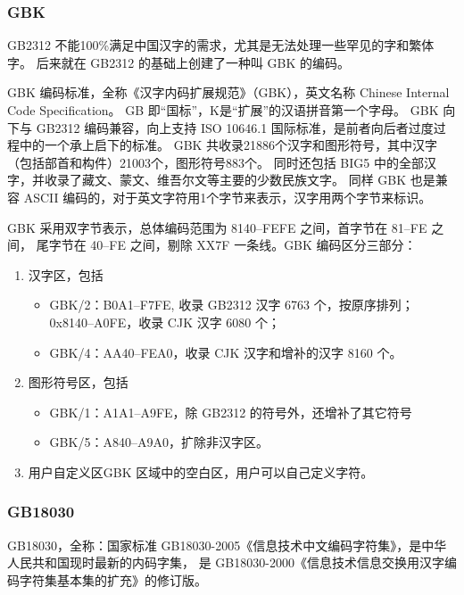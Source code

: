\subsubsection{GBK}
GB2312 不能100\%满足中国汉字的需求，尤其是无法处理一些罕见的字和繁体字。
后来就在 GB2312 的基础上创建了一种叫 GBK 的编码。

GBK 编码标准，全称《汉字内码扩展规范》（GBK），英文名称 Chinese Internal Code Specification。
GB 即“国标”，K是“扩展”的汉语拼音第一个字母。
GBK 向下与 GB2312 编码兼容，向上支持 ISO 10646.1 国际标准，是前者向后者过度过程中的一个承上启下的标准。
GBK 共收录21886个汉字和图形符号，其中汉字（包括部首和构件）21003个，图形符号883个。
同时还包括 BIG5 中的全部汉字，并收录了藏文、蒙文、维吾尔文等主要的少数民族文字。
同样 GBK 也是兼容 ASCII 编码的，对于英文字符用1个字节来表示，汉字用两个字节来标识。

GBK 采用双字节表示，总体编码范围为 8140--FEFE 之间，首字节在 81--FE 之间，
尾字节在 40--FE 之间，剔除 XX7F 一条线。GBK 编码区分三部分：
\begin{enumerate}
  \item 汉字区，包括
      \begin{itemize}
        \item GBK/2：B0A1--F7FE, 收录 GB2312 汉字 6763 个，按原序排列；0x8140--A0FE，收录 CJK 汉字 6080 个；
        \item GBK/4：AA40--FEA0，收录 CJK 汉字和增补的汉字 8160 个。
      \end{itemize}
  \item 图形符号区，包括
      \begin{itemize}
        \item GBK/1：A1A1--A9FE，除 GB2312 的符号外，还增补了其它符号          
        \item GBK/5：A840--A9A0，扩除非汉字区。
      \end{itemize}
  \item 用户自定义区GBK 区域中的空白区，用户可以自己定义字符。
\end{enumerate}

\subsubsection{GB18030}
GB18030，全称：国家标准 GB18030-2005《信息技术中文编码字符集》，是中华人民共和国现时最新的内码字集，
是 GB18030-2000《信息技术信息交换用汉字编码字符集基本集的扩充》的修订版。

